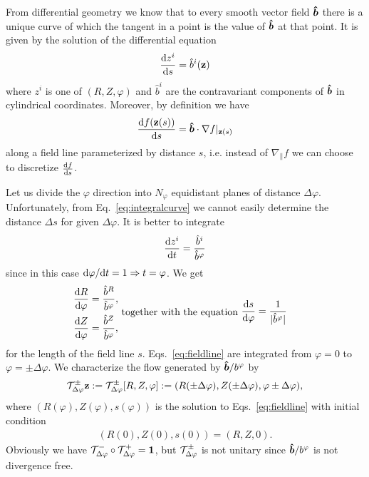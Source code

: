 From differential geometry we 
know that to every smooth vector field $\bm{\hat{b}}$ there is a unique curve of which the
tangent in a point is the value of $\bm{\hat{b}}$ at that point. It is given by
the solution of the differential equation
\begin{align}
    \frac{\mathrm{d} z^i}{\mathrm{d} s} = \hat b^i({\mathbf{z}})
    \label{eq:integralcurve}
\end{align}
where $z^i$ is one of $(R, Z, \varphi)$ and $\hat b^i$ are the contravariant components
of $\bm{\hat{b}}$ in cylindrical coordinates. 
Moreover, by definition we have
\begin{align}
    \frac{\mathrm{d} f({\mathbf{z}}(s))}{\mathrm{d} s} = \bm{\hat{b}}\cdot \nabla f|_{{\mathbf{z}}(s)}
    \label{}
\end{align}
along a field line parameterized by distance $s$, 
i.e. instead of $\nabla_\parallel f$ we can choose to discretize $\frac{\mathrm{d} f}{\mathrm{d} s}$.

Let us divide the $\varphi$ direction into $N_\varphi$ equidistant planes of distance
$\Delta \varphi$. Unfortunately, from Eq.~\eqref{eq:integralcurve} we cannot easily determine the 
distance $\Delta s$ for given $\Delta \varphi$. It is better to integrate
\begin{align}
    \frac{\mathrm{d} z^i}{\mathrm{d} t} = \frac{\hat b^i}{\hat b^\varphi}
    \label{}
\end{align}
since in this case $\mathrm{d}\varphi/\mathrm{d} t = 1 \Rightarrow t=\varphi$. We get
\begin{subequations}
\begin{align}
    \frac{\d R}{\d\varphi}&= \frac{\hat b^R}{\hat b^\varphi},\\ %
    \frac{\d Z}{\d\varphi}&=\frac{\hat b^Z}{\hat b^\varphi},%
\end{align}
\text{ together with the equation  }
\begin{align}
    \frac{\d s}{\d\varphi} &= \frac{1}{|\hat b^\varphi|} %
    \label{eq:fieldlinec}
\end{align}
\label{eq:fieldline}
\end{subequations}
for the length of the field line $s$. 
Eqs.~\eqref{eq:fieldline} are integrated from $\varphi=0$ to $\varphi=\pm \Delta \varphi$. 
We characterize the flow generated by $\bm{\hat{b}}/b^\varphi$ by
\begin{align}
    \mathcal T^\pm_{\Delta\varphi}{\mathbf{z}} := \mathcal T^\pm_{\Delta\varphi}[R, Z, \varphi]:= ( R(\pm \Delta\varphi), Z( \pm \Delta\varphi), \varphi\pm\Delta \varphi),
    \label{}
\end{align}
where $(R(\varphi), Z(\varphi), s(\varphi))$ is the solution to Eqs.~\eqref{eq:fieldline} 
with initial condition 
\begin{align}
    (R(0), Z(0), s(0)) = (R, Z, 0).
    \label{}
\end{align} 
Obviously we have $\mathcal T^-_{\Delta\varphi}\circ\mathcal T^+_{\Delta\varphi} = \mathbf{1}$, but $\mathcal T^\pm_{\Delta\varphi}$ is not unitary since $\bm{\hat{b}}/b^\varphi$ is 
not divergence free. 

